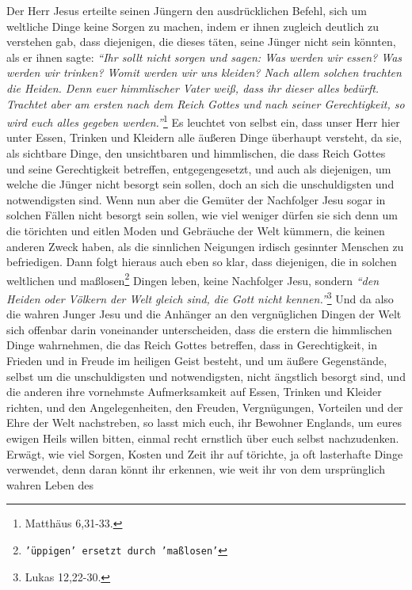 Der Herr Jesus erteilte seinen Jüngern den ausdrücklichen Befehl, sich um
weltliche Dinge keine Sorgen zu machen, indem er ihnen zugleich deutlich zu
verstehen gab, dass diejenigen, die dieses täten, seine Jünger nicht sein
könnten, als er ihnen sagte:
\textit{"`Ihr sollt nicht sorgen und sagen: Was werden wir
essen? Was werden wir trinken? Womit werden wir uns kleiden? Nach allem solchen
trachten die Heiden. Denn euer himmlischer Vater weiß, dass ihr dieser alles
bedürft. Trachtet aber am ersten nach dem Reich Gottes und nach seiner
Gerechtigkeit, so wird euch alles gegeben werden."'}\footnote{Matthäus 6,31-33.}
Es leuchtet von selbst ein, dass unser Herr hier unter Essen,
Trinken und Kleidern alle äußeren Dinge überhaupt versteht, da sie, als
sichtbare Dinge, den unsichtbaren und himmlischen, die dass Reich
Gottes und
seine Gerechtigkeit betreffen, entgegengesetzt, und auch als diejenigen, um
welche die Jünger nicht besorgt sein sollen, doch an sich die unschuldigsten und
notwendigsten sind. Wenn nun aber die Gemüter der Nachfolger Jesu sogar in
solchen Fällen nicht besorgt sein sollen, wie viel weniger dürfen sie sich denn
um die törichten und eitlen Moden und Gebräuche der Welt kümmern, die keinen
anderen Zweck haben, als die sinnlichen Neigungen irdisch gesinnter Menschen zu
befriedigen. Dann folgt hieraus auch eben so klar, dass diejenigen, die in
solchen weltlichen und maßlosen\footnote{\texttt{'üppigen' ersetzt durch
'maßlosen'}}
Dingen leben, keine Nachfolger Jesu, sondern
\textit{"`den Heiden oder Völkern der Welt gleich sind, die Gott nicht
kennen."'}\footnote{Lukas 12,22-30.}
Und da also die wahren Junger Jesu und die
Anhänger an den vergnüglichen Dingen der Welt sich offenbar darin voneinander
unterscheiden, dass die erstern die himmlischen Dinge wahrnehmen, die das Reich
Gottes betreffen, dass in Gerechtigkeit, in Frieden und in Freude im heiligen
Geist besteht, und um äußere Gegenstände, selbst um die unschuldigsten und
notwendigsten, nicht ängstlich besorgt sind, und die anderen ihre vornehmste
Aufmerksamkeit auf Essen, Trinken und Kleider richten, und den Angelegenheiten,
den Freuden, Vergnügungen, Vorteilen und der Ehre der Welt nachstreben, so lasst
mich euch, ihr Bewohner Englands, um eures ewigen
Heils willen 
bitten, einmal
recht ernstlich über euch selbst nachzudenken. Erwägt, wie viel Sorgen, Kosten
und Zeit ihr auf törichte, ja oft lasterhafte Dinge verwendet, denn daran
könnt ihr erkennen, wie weit ihr von dem ursprünglich wahren Leben des
